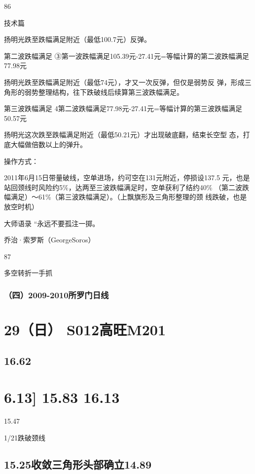 \documentclass{article}
\begin{document}
86

\clearpage

技术篇

扬明光跌至跌幅满足附近（最低100.7元）反弹。

第二波跌幅满足 ③第一波跌幅满足105.39元-27.41元=等幅计算的第二波跌幅满足77.98元

扬明光跌至跌幅满足附近（最低74元），才又一次反弹，但仅是弱势反 弹，形成三角形的弱势整理结构，往下跌破线后续算第三波跌幅满足。

第三波跌幅满足 4第二波跌幅满足77.98元-27.41元=等幅计算的第三波跌幅满足50.57元

扬明光这次跌至跌幅满足附近（最低50.21元）才出现破底翻，结束长空型 态，打底大幅做倍数以上的弹升。

操作方式：

2011年6月15日带量破线，空单进场，约可空在131元附近，停损设137.5 元，也是站回颈线时风险约5\%，达两至三波跌幅满足时，空单获利了结约40\% （第二波跌幅满足）～61\%（第三波跌幅满足）。（上飘旗形及三角形整理的颈 线跌破，也是放空时机）

大师语录 “永远不要孤注一掷。

乔治·索罗斯（GeorgeSoros）

87

\clearpage

多空转折一手抓

\subsubsection{（四）2009-2010所罗门日线}

\section{29（日） S012高旺M201}

\subsection{16.62}

\section{6.13] 15.83 16.13}

15.47

1/21跌破颈线

\subsection{15.25收敛三角形头部确立14.89}
\end{document}
